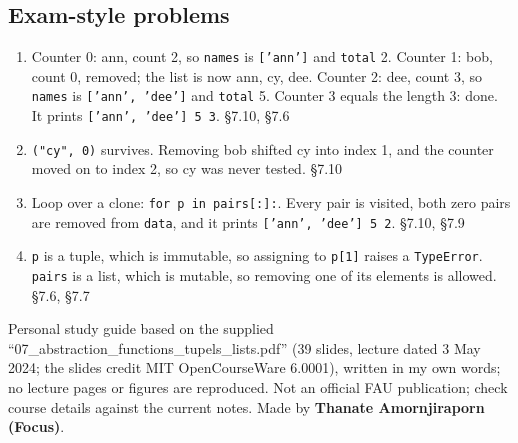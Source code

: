 \documentclass[11pt]{article}
\begin{document}
\begin{keepsection}\subsection{Exam-style problems}

\begin{enumerate}
\item Counter 0: ann, count 2, so \texttt{names} is \texttt{['ann']} and \texttt{total} 2. Counter 1: bob, count 0, removed; the list is now ann, cy, dee. Counter 2: dee, count 3, so \texttt{names} is \texttt{['ann', 'dee']} and \texttt{total} 5. Counter 3 equals the length 3: done. It prints \texttt{['ann', 'dee'] 5 3}. \hfill{\small\color{FAUblue}§7.10, §7.6}
\item \texttt{("cy", 0)} survives. Removing bob shifted cy into index 1, and the counter moved on to index 2, so cy was never tested. \hfill{\small\color{FAUblue}§7.10}
\item Loop over a clone: \texttt{for p in pairs[:]:}. Every pair is visited, both zero pairs are removed from \texttt{data}, and it prints \texttt{['ann', 'dee'] 5 2}. \hfill{\small\color{FAUblue}§7.10, §7.9}
\item \texttt{p} is a tuple, which is immutable, so assigning to \texttt{p[1]} raises a \texttt{TypeError}. \texttt{pairs} is a list, which is mutable, so removing one of its elements is allowed. \hfill{\small\color{FAUblue}§7.6, §7.7}
\end{enumerate}

\end{keepsection}

\vfill{\small Personal study guide based on the supplied “07\_abstraction\_functions\_tupels\_lists.pdf” (39 slides, lecture dated 3 May 2024; the slides credit MIT OpenCourseWare 6.0001), written in my own words; no lecture pages or figures are reproduced. Not an official FAU publication; check course details against the current notes. Made by \textbf{Thanate Amornjiraporn (Focus)}.}
\end{document}
